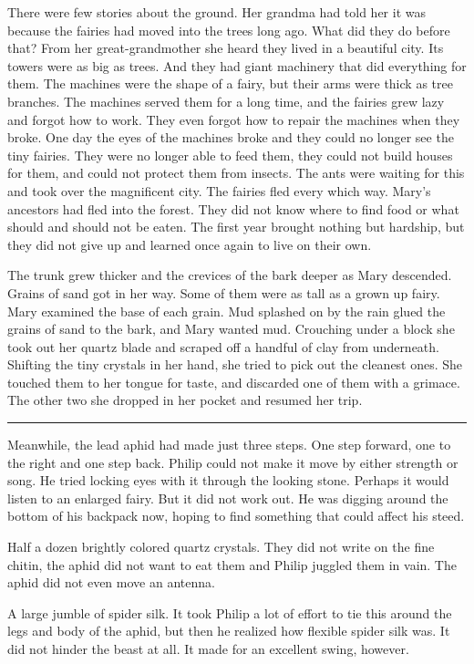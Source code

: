 \documentclass[10pt]{memoir}
\renewcommand{\pfbreakdisplay}{\bigskip \ding{166} \bigskip}
\newcommand{\secbreak}{\fancybreak{\pfbreakdisplay}}
\begin{document}
There were few stories about the ground. Her grandma had told her it was
because the fairies had moved into the trees long ago. What did they do before
that? From her great-grandmother she heard they lived in a beautiful city. Its
towers were as big as trees. And they had giant machinery that did everything
for them. The machines were the shape of a fairy, but their arms were thick as
tree branches. The machines served them for a long time, and the fairies grew
lazy and forgot how to work. They even forgot how to repair the machines when
they broke. One day the eyes of the machines broke and they could no longer see
the tiny fairies. They were no longer able to feed them, they could not build
houses for them, and could not protect them from insects. The ants were waiting
for this and took over the magnificent city. The fairies fled every which way.
Mary's ancestors had fled into the forest. They did not know where to find food
or what should and should not be eaten. The first year brought nothing but
hardship, but they did not give up and learned once again to live on their own.

The trunk grew thicker and the crevices of the bark deeper as Mary descended.
Grains of sand got in her way. Some of them were as tall as a grown up fairy.
Mary examined the base of each grain. Mud splashed on by the rain glued the
grains of sand to the bark, and Mary wanted mud. Crouching under a block she
took out her quartz blade and scraped off a handful of clay from underneath.
Shifting the tiny crystals in her hand, she tried to pick out the cleanest
ones. She touched them to her tongue for taste, and discarded one of them with
a grimace. The other two she dropped in her pocket and resumed her trip.

\secbreak

Meanwhile, the lead aphid had made just three steps. One step forward, one to
the right and one step back. Philip could not make it move by either strength
or song. He tried locking eyes with it through the looking stone. Perhaps it
would listen to an enlarged fairy. But it did not work out. He was digging
around the bottom of his backpack now, hoping to find something that could
affect his steed.

Half a dozen brightly colored quartz crystals. They did not write on the fine
chitin, the aphid did not want to eat them and Philip juggled them in vain.
The aphid did not even move an antenna.

A large jumble of spider silk. It took Philip a lot of effort to tie this
around the legs and body of the aphid, but then he realized how flexible spider
silk was. It did not hinder the beast at all. It made for an excellent swing,
however.
\end{document}
